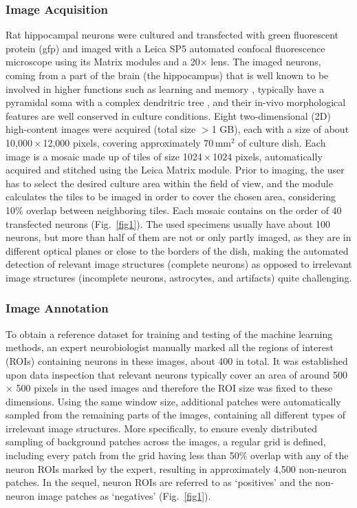 \subsubsection{Image Acquisition}
\label{sec:acquisition}
Rat hippocampal neurons were cultured and transfected with green fluorescent protein (\gls{gfp}) and imaged with a Leica SP5 automated confocal fluorescence microscope using its Matrix modules and a 20$\times$ lens. The imaged neurons, coming from a part of the brain (the hippocampus) that is well known to be involved in higher functions such as learning and memory \cite{squire1992memory}, typically have a pyramidal soma with a complex dendritric tree \cite{goslin1998rat}, and their in-vivo morphological features are well conserved in culture conditions. Eight two-dimensional (2D) high-content images were acquired (total size $>$1 GB), each with a size of about 10,000\,$\times$\,12,000 pixels, covering approximately 70\,mm${}^2$ of culture dish. Each image is a mosaic made up of tiles of size 1024\,$\times$\,1024 pixels, automatically acquired and stitched using the Leica Matrix module. Prior to imaging, the user has to select the desired culture area within the field of view, and the module calculates the tiles to be imaged in order to cover the chosen area, considering 10\% overlap between neighboring tiles. Each mosaic contains on the order of 40 transfected neurons (Fig.\ \ref{fig1}). The used specimens usually have about 100 neurons, but more than half of them are not or only partly imaged, as they are in different optical planes or close to the borders of the dish, making the automated detection of relevant image structures (complete neurons) as opposed to irrelevant image structures (incomplete neurons, astrocytes, and artifacts) quite challenging.

\subsubsection{Image Annotation}
\label{sec:annotation}
To obtain a reference dataset for training and testing of the machine learning methods, an expert neurobiologist manually marked all the regions of interest (ROIs) containing neurons in these images, about 400 in total. It was established upon data inspection that relevant neurons typically cover an area of around 500 $\times$ 500 pixels in the used images and therefore the ROI size was fixed to these dimensions. Using the same window size, additional patches were automatically sampled from the remaining parts of the images, containing all different types of irrelevant image structures. More specifically, to ensure evenly distributed sampling of background patches across the images, a regular grid is defined, including every patch from the grid having less than 50\% overlap with any of the neuron ROIs marked by the expert, resulting in approximately 4,500 non-neuron patches. In the sequel, neuron ROIs are referred to as `positives' and the non-neuron image patches as `negatives' (Fig.~\ref{fig1}).

